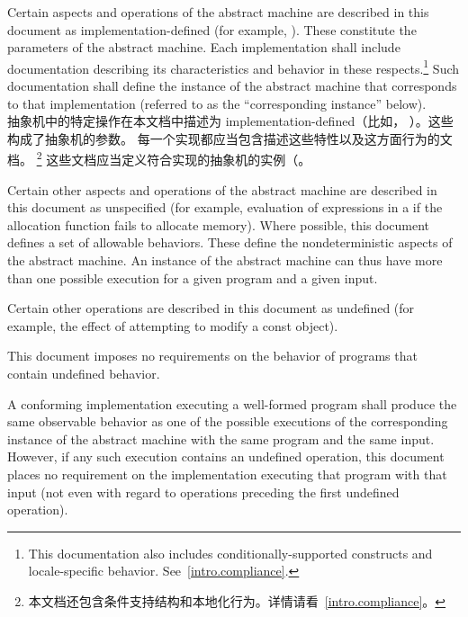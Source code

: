 %
\pnum
Certain aspects and operations of the abstract machine are described in this
document as implementation-defined (for example,
). These constitute the parameters of the abstract machine.
Each implementation shall include documentation describing its characteristics
and behavior in these respects.\footnote{This documentation also includes
conditionally-supported constructs and locale-specific behavior.
See~\ref{intro.compliance}.} Such documentation shall define the instance of the
abstract machine that corresponds to that implementation (referred to as the
``corresponding instance'' below). \\
抽象机中的特定操作在本文档中描述为 implementation-defined（比如，
）。这些构成了抽象机的参数。
每一个实现都应当包含描述这些特性以及这方面行为的文档。
\footnote{本文档还包含条件支持结构和本地化行为。详情请看~\ref{intro.compliance}。}
这些文档应当定义符合实现的抽象机的实例（。

%
\pnum
Certain other aspects and operations of the abstract machine are
described in this document as unspecified (for example,
evaluation of expressions in a  if the allocation
function fails to allocate memory). Where possible, this
document defines a set of allowable behaviors. These
define the nondeterministic aspects of the abstract machine. An instance
of the abstract machine can thus have more than one possible execution
for a given program and a given input.

%
\pnum
Certain other operations are described in this document as
undefined (for example, the effect of
attempting to modify a const object).
\begin{note} This document imposes no requirements on the
behavior of programs that contain undefined behavior. \end{note}

%
%
\pnum
A conforming implementation executing a well-formed program shall
produce the same observable behavior as one of the possible executions
of the corresponding instance of the abstract machine with the
same program and the same input.
%
However, if any such execution contains an undefined operation, this document places no
requirement on the implementation executing that program with that input
(not even with regard to operations preceding the first undefined
operation).

